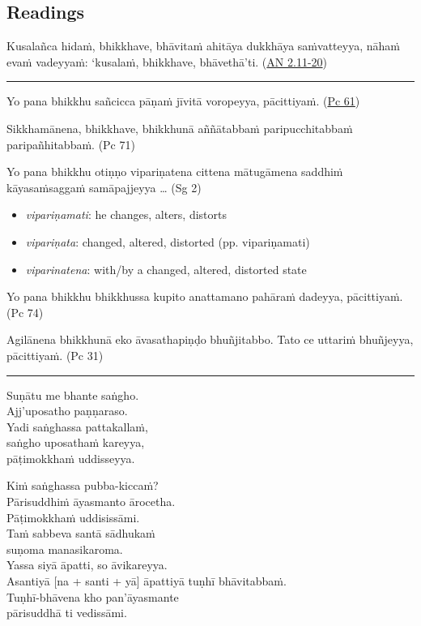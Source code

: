 \documentclass[11pt,oneside]{memoir}
\begin{document}
\normalArrayStrech

\clearpage

\subsection{Readings}
\label{sec:org8e74a70}

Kusalañca hidaṁ, bhikkhave, bhāvitaṁ ahitāya dukkhāya saṁvatteyya, nāhaṁ evaṁ vadeyyaṁ: `kusalaṁ, bhikkhave, bhāvethā'ti. (\href{https://suttacentral.net/an2.11-20/pli/ms}{AN 2.11-20})

\noindent\rule{\textwidth}{0.5pt}

Yo pana bhikkhu sañcicca pāṇaṁ jīvitā voropeyya, pācittiyaṁ. (\href{https://suttacentral.net/pli-tv-bu-vb-pc61/pli/ms}{Pc 61})

Sikkhamānena, bhikkhave, bhikkhunā aññātabbaṁ paripucchitabbaṁ paripañhitabbaṁ. (Pc 71)

Yo pana bhikkhu otiṇṇo vipariṇatena cittena mātugāmena saddhiṁ kāyasaṁsaggaṁ samāpajjeyya \ldots{} (Sg 2)

\begin{itemize}
\item \emph{vipariṇamati}: he changes, alters, distorts
\item \emph{vipariṇata}: changed, altered, distorted (pp. vipariṇamati)
\item \emph{viparinatena}: with/by a changed, altered, distorted state
\end{itemize}

Yo pana bhikkhu bhikkhussa kupito anattamano pahāraṁ dadeyya, pācittiyaṁ. (Pc 74)

Agilānena bhikkhunā eko āvasathapiṇḍo bhuñjitabbo. Tato ce uttariṁ bhuñjeyya, pācittiyaṁ. (Pc 31)

\noindent\rule{\textwidth}{0.5pt}

Suṇātu me bhante saṅgho. \\[0pt]
Ajj'uposatho paṇṇaraso. \\[0pt]
Yadi saṅghassa pattakallaṁ, \\[0pt]
saṅgho uposathaṁ kareyya, \\[0pt]
pāṭimokkhaṁ uddisseyya.

Kiṁ saṅghassa pubba-kiccaṁ? \\[0pt]
Pārisuddhiṁ āyasmanto ārocetha. \\[0pt]
Pāṭimokkhaṁ uddisissāmi. \\[0pt]
Taṁ sabbeva santā sādhukaṁ \\[0pt]
suṇoma manasikaroma. \\[0pt]
Yassa siyā āpatti, so āvikareyya. \\[0pt]
Asantiyā [na + santi + yā] āpattiyā tuṇhī bhāvitabbaṁ. \\[0pt]
Tuṇhī-bhāvena kho pan'āyasmante \\[0pt]
pārisuddhā ti vedissāmi.
\end{document}
